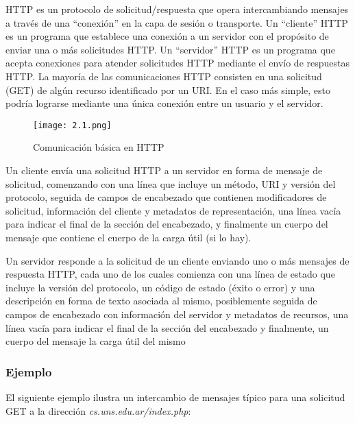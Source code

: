 HTTP es un protocolo de solicitud/respuesta que opera intercambiando 
mensajes a través de una ``conexión'' en la capa de sesión o transporte.
 Un “cliente” HTTP es un programa que establece una conexión a un 
 servidor con el propósito de enviar una o más solicitudes HTTP. 
 Un “servidor” HTTP es un programa que acepta conexiones para
  atender solicitudes HTTP mediante el envío de respuestas HTTP. 
  La mayoría de las comunicaciones HTTP consisten en una solicitud
   (GET) de algún recurso identificado por un URI. En el caso más 
   simple, esto podría lograrse mediante una única conexión entre un
    usuario y el servidor.

\begin{center}
   \begin{figure}   
      \begin{center}
         \texttt{[image: 2.1.png]}
      \end{center}
      \caption{Comunicación básica en HTTP}
   \end{figure}
\end{center}

Un cliente envía una solicitud HTTP a un servidor en forma de mensaje
 de solicitud, comenzando con una línea que incluye un método, URI y 
 versión del protocolo, seguida de campos de encabezado que contienen
  modificadores de solicitud, información del cliente y metadatos de
   representación, una línea vacía para indicar el final de la sección
    del encabezado, y finalmente un cuerpo del mensaje que contiene el 
    cuerpo de la carga útil (si lo hay). 
    
    Un servidor responde a la 
    solicitud de un cliente enviando uno o más mensajes de respuesta 
    HTTP, cada uno de los cuales comienza con una línea de estado que 
    incluye la versión del protocolo, un código de estado (éxito o error)
     y una descripción en forma de texto asociada al mismo, posiblemente 
     seguida de campos de encabezado con información del servidor y
      metadatos de recursos, una línea vacía para indicar el final 
      de la sección del encabezado y finalmente, un cuerpo del mensaje
       la carga útil del mismo

\subsubsection*{Ejemplo}
El siguiente ejemplo ilustra un intercambio de mensajes típico 
para una solicitud GET a la dirección \textit{cs.uns.edu.ar/index.php}:

